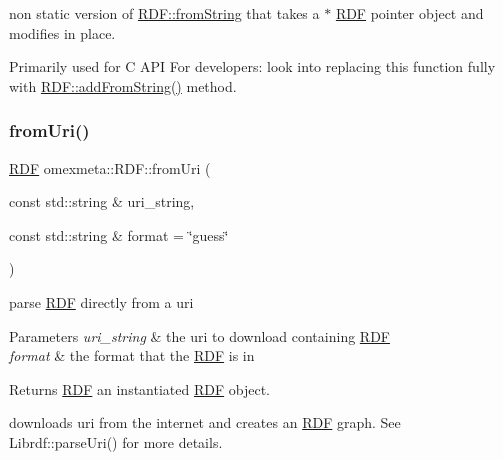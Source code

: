 non static version of \hyperlink{classomexmeta_1_1RDF_a9d91b3134cdcc6dfef6d62b7b09d8da2}{R\+D\+F\+::from\+String} that takes a $\ast$ \hyperlink{classomexmeta_1_1RDF}{R\+DF} pointer object and modifies in place. 

Primarily used for C A\+PI For developers\+: look into replacing this function fully with \hyperlink{classomexmeta_1_1RDF_a9a29912bc44d47d371a2357b75194fc3}{R\+D\+F\+::add\+From\+String()} method. \mbox{\label{classomexmeta_1_1RDF_a03906aa5c3b9429a2afdbe0ad2be21e6}} 
\subsubsection{\texorpdfstring{from\+Uri()}{fromUri()}}
{\footnotesize\ttfamily \hyperlink{classomexmeta_1_1RDF}{R\+DF} omexmeta\+::\+R\+D\+F\+::from\+Uri (\begin{DoxyParamCaption}\item[{const std\+::string \&}]{uri\+\_\+string,  }\item[{const std\+::string \&}]{format = {\ttfamily \char`\"{}guess\char`\"{}} }\end{DoxyParamCaption})\hspace{0.3cm}{\ttfamily [static]}}



parse \hyperlink{classomexmeta_1_1RDF}{R\+DF} directly from a uri 


\begin{DoxyParams}{Parameters}
{\em uri\+\_\+string} & the uri to download containing \hyperlink{classomexmeta_1_1RDF}{R\+DF} \\
\hline
{\em format} & the format that the \hyperlink{classomexmeta_1_1RDF}{R\+DF} is in \\
\hline
\end{DoxyParams}
\begin{DoxyReturn}{Returns}
\hyperlink{classomexmeta_1_1RDF}{R\+DF} an instantiated \hyperlink{classomexmeta_1_1RDF}{R\+DF} object.
\end{DoxyReturn}
downloads uri from the internet and creates an \hyperlink{classomexmeta_1_1RDF}{R\+DF} graph. See Librdf\+::parse\+Uri() for more details. \mbox{\label{classomexmeta_1_1RDF_a1b3bd1292e77c1d87720f854ec5a04bd}} 
